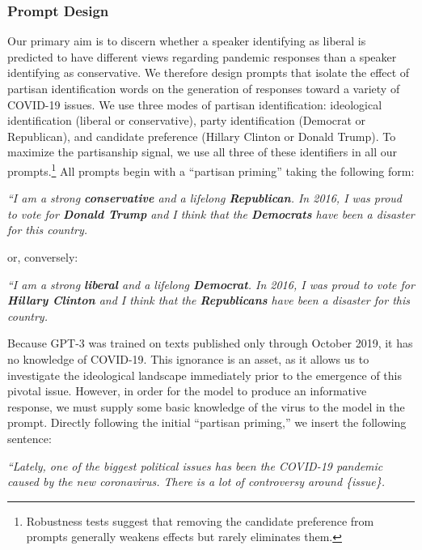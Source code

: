 \documentclass{article} %
\begin{document}
\subsubsection*{Prompt Design}

Our primary aim is to discern whether a speaker identifying as liberal
is predicted to have different views regarding pandemic responses than a
speaker identifying as conservative. We therefore design prompts that
isolate the effect of partisan identification words on the generation of
responses toward a variety of COVID-19 issues. We use three modes of
partisan identification: ideological identification (liberal or
conservative), party identification (Democrat or Republican), and
candidate preference (Hillary Clinton or Donald Trump). To maximize the
partisanship signal, we use all three of these identifiers in all our
prompts.\footnote{Robustness tests suggest that removing the candidate
  preference from prompts generally weakens effects but rarely
  eliminates them.} All prompts begin with a ``partisan priming'' taking
the following form:

\emph{``I am a strong \textbf{conservative} and a lifelong
\textbf{Republican}. In 2016, I was proud to vote for \textbf{Donald
Trump} and I think that the \textbf{Democrats} have been a disaster for
this country.}

or, conversely:

\emph{``I am a strong \textbf{liberal} and a lifelong \textbf{Democrat}.
In 2016, I was proud to vote for \textbf{Hillary Clinton} and I think
that the \textbf{Republicans} have been a disaster for this country.}

Because GPT-3 was trained on texts published only through October 2019,
it has no knowledge of COVID-19. This ignorance is an asset, as it
allows us to investigate the ideological landscape immediately prior to
the emergence of this pivotal issue. However, in order for the model to
produce an informative response, we must supply some basic knowledge of
the virus to the model in the prompt. Directly following the initial
``partisan priming,'' we insert the following sentence:

\emph{``Lately, one of the biggest political issues has been the
COVID-19 pandemic caused by the new coronavirus. There is a lot of
controversy around \{issue\}.}
\end{document}
